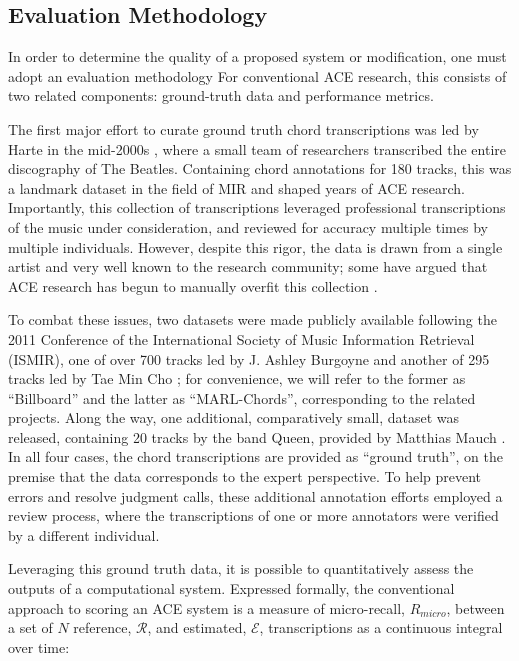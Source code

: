 \subsection{Evaluation Methodology}
\label{subsec:eval_methodology}

In order to determine the quality of a proposed system or modification, one must adopt an evaluation methodology
For conventional ACE research, this consists of two related components: ground-truth data and performance metrics.

The first major effort to curate ground truth chord transcriptions was led by Harte in the mid-2000s \cite{Isophonics}, where a small team of researchers transcribed the entire discography of The Beatles.
Containing chord annotations for 180 tracks, this was a landmark dataset in the field of MIR and shaped years of ACE research.
Importantly, this collection of transcriptions leveraged professional transcriptions of the music under consideration, and reviewed for accuracy multiple times by multiple individuals.
However, despite this rigor, the data is drawn from a single artist and very well known to the research community; some have argued that ACE research has begun to manually overfit this collection \cite{}.

To combat these issues, two datasets were made publicly available following the 2011 Conference of the International Society of Music Information Retrieval (ISMIR), one of over 700 tracks led by J. Ashley Burgoyne \cite{Burgoyne2011} and another of 295 tracks led by Tae Min Cho \cite{Cho2011b}; for convenience, we will refer to the former as ``Billboard'' and the latter as ``MARL-Chords'', corresponding to the related projects.
Along the way, one additional, comparatively small, dataset was released, containing 20 tracks by the band Queen, provided by Matthias Mauch \cite{Mauch2009x}.
In all four cases, the chord transcriptions are provided as ``ground truth'', on the premise that the data corresponds to the expert perspective.
To help prevent errors and resolve judgment calls, these additional annotation efforts employed a review process, where the transcriptions of one or more annotators were verified by a different individual.

Leveraging this ground truth data, it is possible to quantitatively assess the outputs of a computational system.
Expressed formally, the conventional approach to scoring an ACE system is a measure of micro-recall, $R_{micro}$, between a set of $N$ reference, $\mathcal{R}$, and estimated, $\mathcal{E}$, transcriptions as a continuous integral over time:

